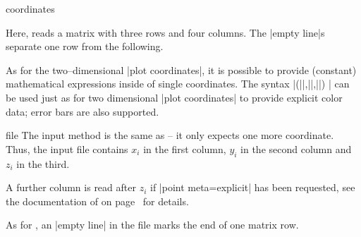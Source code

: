 {\begin{addplot3operation}[]{coordinates}{}
\begin{codeexample}[]
\end{codeexample}
	\noindent Here,  reads a matrix with three rows and four columns. The |empty line|s separate one row from the following.

	As for the two--dimensional |plot coordinates|, it is possible to provide (constant) mathematical expressions inside of single coordinates. The syntax |(||,||,||) | can be used just as for two dimensional |plot coordinates| to provide explicit color data; error bars are also supported.
\end{addplot3operation}

\begin{addplot3operation}[]{file}{}
	The  input method is the same as  -- it only expects one more coordinate.
	Thus, the input file contains $x_i$ in the first column, $y_i$ in the second column and $z_i$ in the third. 
	
	A further column is read after $z_i$ if |point meta=explicit| has been requested, see the documentation of  on page~\pageref{pgfplots:addplot:file} for details.
	
	As for , an |empty line| in the file marks the end of one matrix row.
\begin{codeexample}[]
\end{codeexample}


\end{addplot3operation}}
